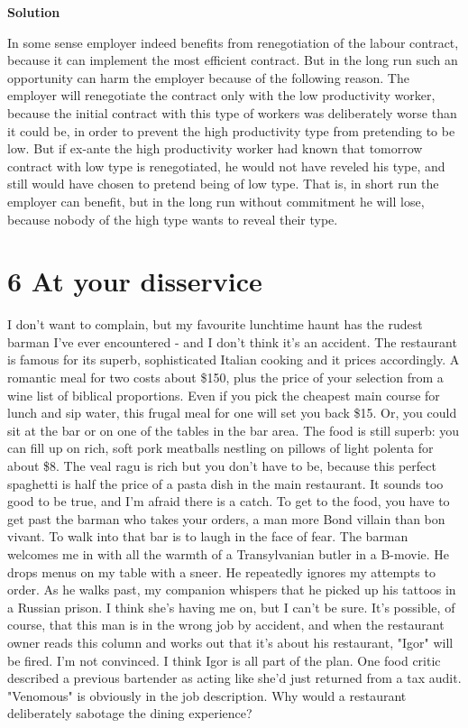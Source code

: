 \documentclass[a4paper]{article}
\begin{document}
		\textbf{Solution}
		
		In some sense employer indeed benefits from renegotiation of the labour contract, because it can implement the most efficient contract. But in the long run such an opportunity can harm the employer because of the following reason. The employer will renegotiate the contract only with the low productivity worker, because the initial contract with this type of workers was deliberately worse than it could be, in order to prevent the high productivity type from pretending to be low. But if ex-ante the high productivity worker had known that tomorrow contract with low type is renegotiated, he would not have reveled his type, and still would have chosen to pretend being of low type. That is, in short run the employer can benefit, but in the long run without commitment he will lose, because nobody of the high type wants to reveal their type.
		
		\section*{6 At your disservice}
		
		I don't want to complain, but my favourite lunchtime haunt has the rudest barman I've
		ever encountered - and I don't think it's an accident. The restaurant is famous for its
		superb, sophisticated Italian cooking and it prices accordingly. A romantic meal for two
		costs about \$150, plus the price of your selection from a wine list of biblical proportions.
		Even if you pick the cheapest main course for lunch and sip water, this frugal meal for
		one will set you back \$15.
		Or, you could sit at the bar or on one of the tables in the bar area. The food is still
		superb: you can fill up on rich, soft pork meatballs nestling on pillows of light polenta for
		about \$8. The veal ragu is rich but you don't have to be, because this perfect spaghetti
		is half the price of a pasta dish in the main restaurant.
		It sounds too good to be true, and I'm afraid there is a catch. To get to the food,
		you have to get past the barman who takes your orders, a man more Bond villain than
		bon vivant. To walk into that bar is to laugh in the face of fear. The barman welcomes
		me in with all the warmth of a Transylvanian butler in a B-movie. He drops menus on
		my table with a sneer. He repeatedly ignores my attempts to order. As he walks past,
		my companion whispers that he picked up his tattoos in a Russian prison. I think she's
		having me on, but I can't be sure.
		It's possible, of course, that this man is in the wrong job by accident, and when
		the restaurant owner reads this column and works out that it's about his restaurant,
		"Igor" will be fired. I'm not convinced. I think Igor is all part of the plan. One food
		critic described a previous bartender as acting like she'd just returned from a tax audit.
		"Venomous" is obviously in the job description.
		Why would a restaurant deliberately sabotage the dining experience?
		
\end{document}
